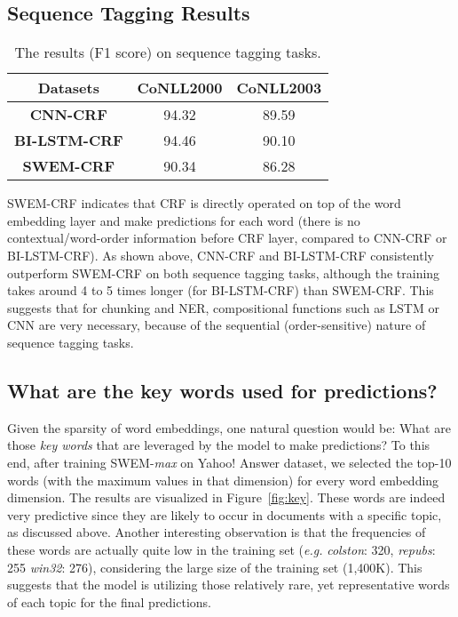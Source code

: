\documentclass[11pt,a4paper]{article}
\begin{document}
\subsection{Sequence Tagging Results}

\begin{table} [!h]
	\centering 
\def\arraystretch{1.2}
	\begin{small}
		\begin{tabular}{c||c|c}
\toprule[1.2pt]
			\textbf{Datasets} &  \textbf{CoNLL2000}  & \textbf{CoNLL2003}  \\
			\hline
			 \textbf{CNN-CRF} & 94.32  & 89.59 \\
			\textbf{BI-LSTM-CRF}  &  94.46  &   90.10  \\
			\textbf{SWEM-CRF}  & 90.34&   86.28 \\
			\bottomrule[1.2pt]
\end{tabular}
	\end{small}
\caption{The results (F1 score) on sequence tagging tasks. }
	\label{tab:tagging}
\end{table}

SWEM-CRF indicates that CRF is directly operated on top of the word embedding layer and make predictions for each word (there is no contextual/word-order information before CRF layer, compared to CNN-CRF or BI-LSTM-CRF). As shown above, CNN-CRF and BI-LSTM-CRF consistently outperform SWEM-CRF on both sequence tagging tasks, although the training takes around 4 to 5 times longer (for BI-LSTM-CRF) than SWEM-CRF. This suggests that for chunking and NER, compositional functions such as LSTM or CNN are very necessary, because of the sequential (order-sensitive) nature of sequence tagging tasks. 

\subsection{What are the key words used for predictions?}
Given the sparsity of word embeddings, one natural question would be: What are those \emph{key words} that are leveraged by the model to make predictions? To this end, after training SWEM-\emph{max} on Yahoo! Answer dataset, we selected the top-10 words (with the maximum values in that dimension) for every word embedding dimension. The results are visualized in Figure~\ref{fig:key}. These words are indeed very predictive since they are likely to occur in documents with a specific topic, as discussed above. Another interesting observation is that the frequencies of these words are actually quite low in the training set (\emph{e.g.} \emph{colston}: 320, \emph{repubs}: 255 \emph{win32}: 276), considering the large size of the training set (1,400K). This suggests that the model is utilizing those relatively rare, yet representative words of each topic for the final predictions.
\end{document}
